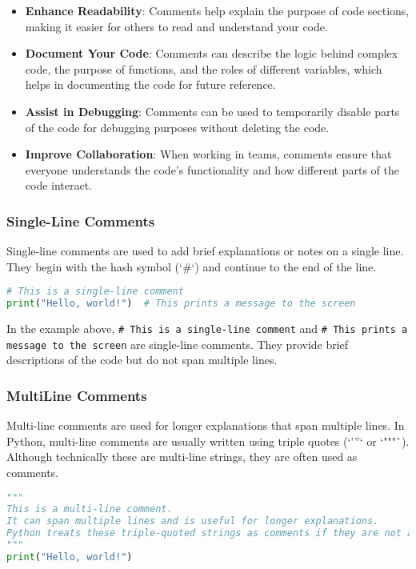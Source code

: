 \begin{itemize}
    \item \textbf{Enhance Readability}: Comments help explain the purpose of code sections, making it easier for others to read and understand your code.
    \item \textbf{Document Your Code}: Comments can describe the logic behind complex code, the purpose of functions, and the roles of different variables, which helps in documenting the code for future reference.
    \item \textbf{Assist in Debugging}: Comments can be used to temporarily disable parts of the code for debugging purposes without deleting the code.
    \item \textbf{Improve Collaboration}: When working in teams, comments ensure that everyone understands the code's functionality and how different parts of the code interact.
\end{itemize}

\subsubsection{Single-Line Comments}

Single-line comments are used to add brief explanations or notes on a single line. They begin with the hash symbol (`\#`) and continue to the end of the line.

\begin{lstlisting}[language=Python, caption=Single-Line Comment Example]
# This is a single-line comment
print("Hello, world!")  # This prints a message to the screen
\end{lstlisting}

In the example above, \texttt{\# This is a single-line comment} and \texttt{\# This prints a message to the screen} are single-line comments. They provide brief descriptions of the code but do not span multiple lines.

\subsubsection{Multi\-Line Comments}

Multi-line comments are used for longer explanations that span multiple lines. In Python, multi-line comments are usually written using triple quotes (`'''` or `"""`). Although technically these are multi-line strings, they are often used as comments.

\begin{lstlisting}[language=Python, caption=Multi-Line Comment Example]
"""
This is a multi-line comment.
It can span multiple lines and is useful for longer explanations.
Python treats these triple-quoted strings as comments if they are not assigned to any variable.
"""
print("Hello, world!")
\end{lstlisting}

